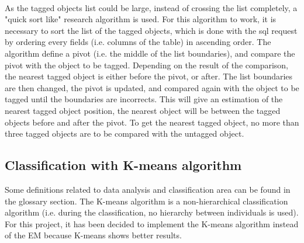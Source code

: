 ~~

As the tagged objects list could be large, instead of crossing the list completely, a "quick sort like" research algorithm is used. For this algorithm to work, it is necessary to sort the list of the tagged objects, which is done with the sql request by ordering every fields (i.e. columns of the table) in ascending order. The algorithm define a pivot (i.e. the middle of the list boundaries), and compare the pivot with the object to be tagged. Depending on the result of the comparison, the nearest tagged object is either before the pivot, or after. The list boundaries are then changed, the pivot is updated, and compared again with the object to be tagged until the boundaries are incorrects. This will give an estimation of the nearest tagged object position, the nearest object will be between the tagged objects before and after the pivot. To get the nearest tagged object, no more than three tagged objects are to be compared with the untagged object. 

% 












\subsection{Classification with K-means algorithm}

Some definitions related to \gls{data analysis} and \gls{classification} area can be found in the glossary section. The K-means \gls{algorithm} is a non-hierarchical \gls{classification} \gls{algorithm} (i.e. during the \gls{classification}, no hierarchy between \glspl{individual} is used). For this project, it has been decided to implement the K-means \gls{algorithm} instead of the \gls{EM} because K-means shows better results. 

